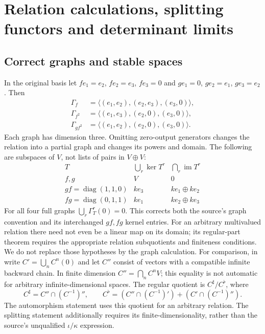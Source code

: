 \section{Relation calculations, splitting functors and determinant limits}
\label{rel:details}
\subsection{Correct graphs and stable spaces}
In the original basis let $f e_1=e_2$, $f e_2=e_3$, $f e_3=0$ and
$g e_1=0$, $g e_2=e_1$, $g e_3=e_2$. Then
\[
\begin{split}
 \Gamma_f&=\langle(e_1,e_2),(e_2,e_3),(e_3,0)\rangle,\\
 \Gamma_{f^2}&=\langle(e_1,e_3),(e_2,0),(e_3,0)\rangle,\\
 \Gamma_{gf^2}&=\langle(e_1,e_2),(e_2,0),(e_3,0)\rangle.
\end{split}
\]
Each graph has dimension three. Omitting zero-output generators changes
the relation into a partial graph and changes its powers and domain.
The following are subspaces of $V$, not lists of pairs in $V\oplus V$:
\[
\begin{array}{c|cc}
T&\bigcup_r\ker T^r&\bigcap_r\operatorname{im}T^r\\\hline
f,g&V&0\\
gf=\operatorname{diag}(1,1,0)&ke_3&ke_1\oplus ke_2\\
fg=\operatorname{diag}(0,1,1)&ke_1&ke_2\oplus ke_3
\end{array}
\]
For all four full graphs $\bigcup_r\Gamma_T^r(0)=0$. This corrects both
the source's graph convention and its interchanged $gf,fg$ kernel entries.
For an arbitrary multivalued relation there need not even be a linear map
on its domain; its regular-part theorem requires the appropriate relation
subquotients and finiteness conditions. We do not replace those hypotheses
by the graph calculation.
For comparison, in \cite[Section 4, Lemmas 4.2,4.5--4.6]{CrawleyBoeveyStrings}
write $C'=\bigcup_n C^n(0)$ and let $C''$ consist of vectors with a
compatible infinite backward chain. In finite dimension $C''=\bigcap_n C^nV$;
this equality is not automatic for arbitrary infinite-dimensional spaces.
The regular quotient is $C^\sharp/C^\flat$, where
\[
 C^\sharp=C''\cap(C^{-1})'',\qquad
 C^\flat=(C''\cap(C^{-1})')+(C'\cap(C^{-1})'').
\]
The automorphism statement uses this quotient for an arbitrary relation.
The splitting statement additionally requires its finite-dimensionality,
rather than the source's unqualified $\iota/\kappa$ expression.

